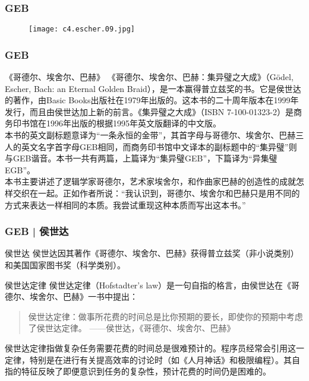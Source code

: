 \begin{frame}
  \frametitle{GEB}
  \begin{figure}
    \centering
    \texttt{[image: c4.escher.09.jpg]}
  \end{figure}
\end{frame}

\begin{frame}
  \frametitle{GEB}
  \begin{block}{《哥德尔、埃舍尔、巴赫》}
    《哥德尔、埃舍尔、巴赫：集异璧之大成》（Gödel, Escher, Bach: an Eternal Golden Braid），是一本赢得普立兹奖的书。它是侯世达的著作，由Basic Books出版社在1979年出版的。这本书的二十周年版本在1999年发行，而且由侯世达加上新的前言。《集异璧之大成》（ISBN 7-100-01323-2）是商务印书馆在1996年出版的根据1995年英文版翻译的中文版。\\
    \vspace{0.3em}
本书的英文副标题意译为“一条永恒的金带”，其首字母与哥德尔、埃舍尔、巴赫三人的英文名字首字母GEB相同，而商务印书馆中文译本的副标题中的“集异璧”则与GEB谐音。本书一共有两篇，上篇译为“集异璧GEB”，下篇译为“异集璧EGB”。 \\
    \vspace{0.3em}
本书主要讲述了逻辑学家哥德尔，艺术家埃舍尔，和作曲家巴赫的创造性的成就怎样交织在一起。正如作者所说：“我认识到，哥德尔、埃舍尔和巴赫只是用不同的方式来表达一样相同的本质。我尝试重现这种本质而写出这本书。”
  \end{block}
\end{frame}

\begin{frame}
  \frametitle{GEB | 侯世达}
  \begin{block}{侯世达}
    侯世达因其著作《哥德尔、埃舍尔、巴赫》获得普立兹奖（非小说类别）和美国国家图书奖（科学类别）。
  \end{block}
  \begin{block}{\alert{侯世达定律}}
    侯世达定律（Hofstadter's law）是一句自指的格言，由侯世达在《哥德尔、埃舍尔、巴赫》一书中提出：
    \begin{quote}
    侯世达定律：做事所花费的时间总是比你预期的要长，即使你的预期中考虑了侯世达定律。 ——侯世达，《哥德尔、埃舍尔、巴赫》
    \end{quote}
侯世达定律指做复杂任务需要花费的时间总是很难预计的。程序员经常会引用这一定律，特别是在进行有关提高效率的讨论时（如《人月神话》和极限编程）。其自指的特征反映了即便意识到任务的复杂性，预计花费的时间仍是困难的。
  \end{block}
\end{frame}

